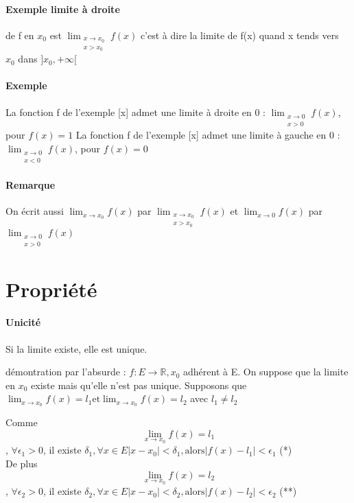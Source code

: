 \paragraph{Exemple limite à droite} de f en $x_0$ est $\lim_{\substack{x \to x_0 \\ x > x_0}} f(x)$ c'est à dire la limite de f(x) quand x tends vers $x_0$ dans $]x_0, +\infty[$

\paragraph{Exemple}
La fonction f de l'exemple [x] admet une limite à droite en 0 : $\lim_{\substack{x \to 0 \\ x > 0}} f(x)$, pour $f(x) = 1$
La fonction f de l'exemple [x] admet une limite à gauche en 0 : $\lim_{\substack{x \to 0 \\ x < 0}} f(x)$, pour $f(x) = 0$

\paragraph{Remarque} On écrit aussi $\lim_{x \to x_0} f(x)$ par $\lim_{\substack{x \to x_0 \\ x > x_0}} f(x)$ et $\lim_{x \to 0} f(x)$ par $\lim_{\substack{x \to 0 \\ x > 0}} f(x)$

\section{Propriété}
\paragraph{Unicité} Si la limite existe, elle est unique.

démontration par l'absurde : $f : E \rightarrow \mathbb{R}, x_0$ adhérent à E. On suppose que la limite en $x_0$ existe mais qu'elle n'est pas unique.
Supposons que $\lim_{x \to x_0} f(x) = l_1 \text{et} \lim_{x \to x_0} f(x) = l_2$ avec $l_1 \neq l_2$

Comme \[ \lim_{x \to x_0} f(x) = l_1\], $\forall \epsilon_1 > 0$, il existe $\delta_1, \forall x \in E |x-x_0|< \delta_1, \text{alors} |f(x) - l_1| < \epsilon_1$ (*)
~\\
De plus\[ \lim_{x \to x_0} f(x) = l_2\], $\forall \epsilon_2 > 0$, il existe $\delta_2, \forall x \in E |x-x_0|< \delta_2, \text{alors} |f(x) - l_2| < \epsilon_2$ (**)
~\\

